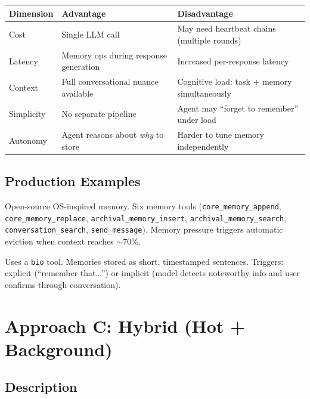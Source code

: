\documentclass[11pt, letterpaper]{article}
\begin{document}
\begin{table}[h]
\centering
\begin{tabularx}{\textwidth}{lXX}
\toprule
\textbf{Dimension} & \textbf{Advantage} & \textbf{Disadvantage} \\
\midrule
Cost & Single LLM call & May need heartbeat chains (multiple rounds) \\
Latency & Memory ops during response generation & Increased per-response latency \\
Context & Full conversational nuance available & Cognitive load: task + memory simultaneously \\
Simplicity & No separate pipeline & Agent may ``forget to remember'' under load \\
Autonomy & Agent reasons about \emph{why} to store & Harder to tune memory independently \\
\bottomrule
\end{tabularx}
\end{table}

\subsection{Production Examples}

\begin{description}[leftmargin=2em, style=nextline]
    \item[MemGPT / Letta] Open-source OS-inspired memory. Six memory tools
        (\texttt{core\_memory\_append}, \texttt{core\_memory\_replace},
        \texttt{archival\_memory\_insert}, \texttt{archival\_memory\_search},
        \texttt{conversation\_search}, \texttt{send\_message}).
        Memory pressure triggers automatic eviction when context reaches $\sim$70\%.
    \item[ChatGPT] Uses a \texttt{bio} tool. Memories stored as short, timestamped
        sentences. Triggers: explicit (``remember that\ldots'') or implicit
        (model detects noteworthy info and user confirms through conversation).
\end{description}

\section{Approach C: Hybrid (Hot + Background)}
\label{sec:hybrid}

\subsection{Description}
\end{document}
